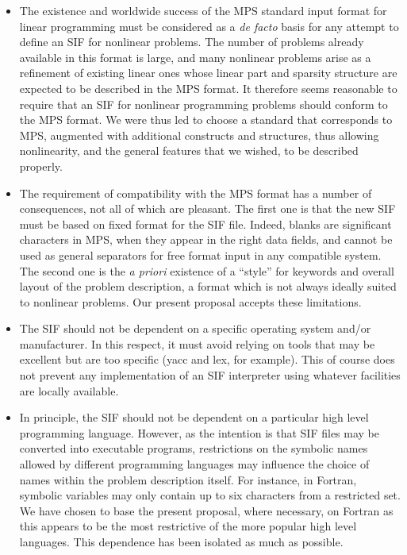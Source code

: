 \documentclass[a4paper]{article}
\begin{document}
\begin{itemize}
\item
The  existence and worldwide success of  the MPS standard input format
for linear programming  must be considered as  a {\em de facto} basis
for any attempt to define an  SIF for  nonlinear problems. The number
of  problems already  available  in this format   is  large,  and many
nonlinear problems arise as a refinement of existing linear ones whose
linear part and sparsity
structure are expected to be described in the
MPS
format. It therefore seems reasonable to require that an  SIF for
nonlinear programming problems  should conform to  the  MPS format. We
were thus led to choose a  standard that  corresponds to MPS,
augmented with  additional  constructs and  structures,  thus allowing
nonlinearity, and the general features that we wished, to be described
properly.


\item
The requirement of compatibility with the MPS format  has a  number of
consequences, not all of which are pleasant. The first one is that the
new SIF must  be based on  fixed format
for the SIF file.  Indeed, blanks
are  significant characters in MPS,
when they appear in the right data fields,
and  cannot be used as general  separators for free format
input in any compatible  system.  The second one  is the {\em a
priori}  existence of  a ``style'' for keywords  and overall layout of
the problem  description, a format which is  not always ideally suited
to  nonlinear problems.   Our   present proposal  accepts  these
limitations.

\item
The SIF should not be dependent on  a specific operating system and/or
manufacturer. In this respect, it must avoid relying on tools that may
be excellent but are too specific (yacc and lex, for example). This of
course does not prevent any implementation of an SIF interpreter using
whatever facilities are locally available.

\item
In principle,  the SIF should  not be dependent on  a particular high
level programming language. However,   as the intention  is that  SIF
files may  be converted into  executable programs, restrictions on the
symbolic  names   allowed  by   different  programming   languages may
influence the choice of names  within the problem  description itself.
For  instance, in Fortran,
symbolic   variables  may only  contain up  to   six characters from a
restricted set.  We  have chosen  to base the present proposal,  where
necessary, on Fortran
as  this appears to  be the most restrictive  of the more popular high
level languages.   This  dependence has  been isolated  as    much  as
possible.
\end{itemize}
\end{document}

